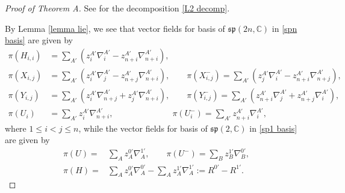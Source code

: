 \documentclass[a4paper,11pt]{amsart}
\numberwithin{equation}{section}
\begin{document}
\begin{proof}[Proof of Theorem A]
See \cite[Proposition 2.1]{Co} for the decomposition \eqref{L2 decomp}.

  By Lemma \ref{lemma lie}, we see that vector fields for basis of $\mathfrak{sp}(2n,\mathbb{C})$ in \eqref{spn basis} are given by
\begin{equation}\begin{aligned}\label{Xij Yij Ui}
\pi(H_{i,i})&= \sum_{A'} (z_{i}^{A'} \nabla_{i}^{A'} - z_{n+i}^{A'} \nabla_{n+i}^{A'}),\\
\pi(X_{i,j})&=\sum_{A'} (z_{i}^{A'} \nabla_{j}^{A'} - z_{n+j}^{A'} \nabla_{n+i}^{A'}),\qquad\pi(X_{i,j}^-)= \sum_{A'} (z_{j}^{A'} \nabla_{i}^{A'} - z_{n+i}^{A'} \nabla_{n+j}^{A'}),\\
\pi(Y_{i,j})&= \sum_{A'} (z_{i}^{A'} \nabla_{n+j}^{A'}+z_{j}^{A'} \nabla_{n+i}^{A'}),\qquad\pi(Y_{i,j}^{-})= \sum_{A'} (z_{n+i}^{A'} \nabla_{j}^{A'}+z_{n+j}^{A'} \nabla_{i}^{A'}),\\
\pi(U_i)&=\sum_{A'}  z_{i}^{A'} \nabla_{n+i}^{A'},\qquad\qquad\qquad\quad\pi(U_i^-) = \sum_{A'} z_{n+i}^{A'} \nabla_{i}^{A'},
\end{aligned}\end{equation}
where $1\leq i<j\leq n$, while the vector fields for basis of $\mathfrak{sp}(2,\mathbb{C})$ in \eqref{sp1 basis} are given by
\begin{equation}\begin{aligned}\label{u H}
\pi(U) =&\sum_{A} z_{A}^{0'} \nabla_{A}^{1'},\qquad\pi(U^{-}) = \sum_{B}  z_{B}^{1'} \nabla_{B}^{0'},\\
\pi(H) =& \sum_{A}  z_{A}^{0'} \nabla_{A}^{0'} - \sum_{A}z_{A}^{1'} \nabla_{A}^{1'}:=R^{0'}-R^{1'}.
\end{aligned}\end{equation}


\end{proof}
\end{document}
